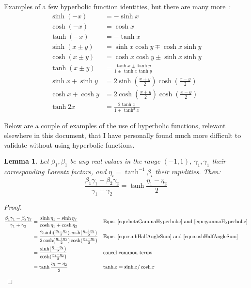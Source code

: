 \documentclass[a4paper]{article}
\theoremstyle{plain}
\newtheorem{lemma}[theorem]{Lemma}
\theoremstyle{definition}
\begin{document}
Examples of a few hyperbolic function identities, but there are many
more~\cite{WikipediaHyperbolicFunctions}:
\begin{align}
\sinh (-x) & = -\sinh x \\
\cosh (-x) & = \cosh x \\
\tanh (-x) & = - \tanh x \\
\sinh (x \pm y) & = \sinh x \cosh y \mp \cosh x \sinh y \\
\cosh (x \pm y) & = \cosh x \cosh y \pm \sinh x \sinh y \\
\tanh (x \pm y) & = \frac{\tanh x \pm \tanh y}{1 \pm \tanh x \tanh y} \\
\sinh x + \sinh y & = 2 \sinh (\frac{x+y}{2} ) \cosh (\frac{x-y}{2}) \label{eqn:sinhHalfAngleSum} \\
\cosh x + \cosh y & = 2 \cosh (\frac{x+y}{2} ) \cosh (\frac{x-y}{2}) \label{eqn:coshHalfAngleSum} \\
\tanh 2x & = \frac{2 \tanh x}{1+\tanh^2 x} \label{eqn:tanhDoubleAngle}
\end{align}

Below are a couple of examples of the use of hyperbolic functions,
relevant elsewhere in this document, that I have personally found much
more difficult to validate without using hyperbolic functions.

\begin{lemma}
\label{lem:halfRapidityDifference}
Let $\beta_1, \beta_1$ be any real values in the range $(-1,1)$,
$\gamma_1, \gamma_1$ their corresponding Lorentz factors, and $\eta_i
= \tanh^{-1} \beta_i$ their rapidities.
Then:
\begin{equation}
\frac{\beta_1 \gamma_1 - \beta_2 \gamma_2}{\gamma_1 + \gamma_2} = \tanh \frac{\eta_1-\eta_2}{2}
\end{equation}
\end{lemma}

\begin{proof}
\begin{align*}
\frac{\beta_1 \gamma_1 - \beta_2 \gamma_2}{\gamma_1 + \gamma_2}
  & = \frac{\sinh \eta_1 - \sinh \eta_2}{\cosh \eta_1 + \cosh \eta_2} & & \text{Eqns.~\eqref{eqn:betaGammaHyperbolic} and~\eqref{eqn:gammaHyperbolic}} \\
  & = \frac{2 \sinh ( \frac{\eta_1-\eta_2}{2} ) \cosh ( \frac{\eta_1+\eta_2}{2} ) }{2 \cosh ( \frac{\eta_1+\eta_2}{2} ) \cosh ( \frac{\eta_1-\eta_2}{2} ) } & & \text{Eqns.~\eqref{eqn:sinhHalfAngleSum} and~\eqref{eqn:coshHalfAngleSum}} \\
  & = \frac{\sinh ( \frac{\eta_1-\eta_2}{2} ) }{\cosh ( \frac{\eta_1-\eta_2}{2} ) } & & \text{cancel common terms} \\
  & = \tanh \frac{\eta_1-\eta_2}{2} & & \text{$\tanh x = \sinh x / \cosh x$}
\end{align*}
\end{proof}
\end{document}
